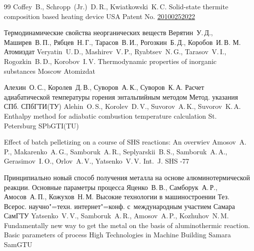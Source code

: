 \begin{thebibliography}{99}
\by Coffey~B., Schropp~(Jr.)~D.\,R., Kwiatkowski~K.\,C.
\eprint Solid-state thermite composition based heating device
\eprintinfo USA Patent No. \href{http://www.faqs.org/patents/app/20100252022}{20100252022}

\book Термодинамические свойства неорганических веществ
\by Верятин~У.\,Д., Маширев~В.\,П., Рябцев~Н.\,Г., Тарасов~В.\,И., Рогозкин~Б.\,Д., Коробов~И.\,В.
\publaddr М.
\publ Атомиздат
\misctransl 
\by Veryatin~U.\,D., Mashirev~V.\,P., Ryabtsev~N.\,G., Tarasov~V.\,I., Rogozkin~B.\,D., Korobov~I.\,V.
\book Thermodynamic properties of inorganic substances
\publaddr Moscow
\publ Atomizdat

 
\by Алехин~О.\,С., Королев~Д.\,В., Суворов~А.\,К., Суворов~К.\,А.
\book Расчет адиабатической температуры горения энтальпийным методом
\bookinfo Метод. указания
\publaddr СПб.
\publ СПбГТИ(ТУ)
\misctransl
\by Alehin~O.\,S., Korolev~D.\,V., Suvorov~A.\,K., Suvorov~K.\,A.
\book Enthalpy method for adiabatic combustion temperature calculation 
\publaddr St. Petersburg
\publ SPbGTI(TU)





\paper Effect of batch pelletizing on a course of SHS reactions: An overwiev
\by Amosov~A.\,P., Makarenko~A.\,G., Samboruk~A.\,R., Seplyarskii~B.\,S., Samboruk~A.\,A., Gerasimov~I.\,O., Orlov~A.\,V., Yatsenko~V.\,V.
\jour Int.~J. SHS
-77

\paper Принципиально новый способ получения металла на основе алюминотермической реакции. Основные параметры процесса
\by Яценко~В.\,В., Самборук~А.\,Р., Амосов~А.\,П., Кожухов~Н.\,М.
\inbook Высокие технологии в машиностроении
\bookinfo Тез. Всерос. научно"=техн. интернет"=конф. с~международным участием
\publaddr Самара
\publ СамГТУ
\misctransl 
\by Yatsenko~V.\,V., Samboruk~A.\,R., Amosov~A.\,P., Kozhuhov~N.\,M.
\paper Fundamentally new way to get the metal on the basis of aluminothermic reaction. Basic parameters of process
\inbook High Technologies in Machine Building
\publaddr Samara
\publ SamGTU


%

\end{thebibliography}

\noindent
\hskip6.5cm \thedate \par\noindent
\hskip6.5cm\therevdate\par



\makeengtitlem

\renewcommand{\baselinestretch}{.9}

\newpage


%
